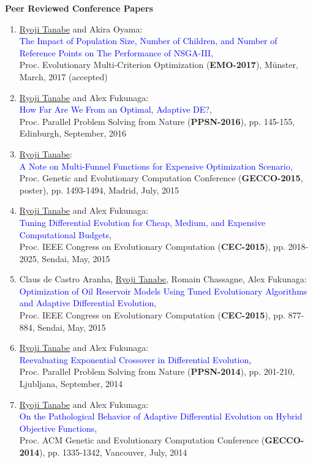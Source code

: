 \documentclass[letterpaper]{article}
\begin{document}
{\bf Peer Reviewed Conference Papers}
\begin{enumerate}
\small
\item \underline{Ryoji Tanabe} and Akira Oyama: \\\textcolor{blue}{The Impact of Population Size, Number of Children, and Number of Reference Points on The Performance of NSGA-III}, \\Proc. Evolutionary Multi-Criterion Optimization ({\bf EMO-2017}), M\"unster, March, 2017 (accepted)
\item \underline{Ryoji Tanabe} and Alex Fukunaga: \\\textcolor{blue}{How Far Are We From an Optimal, Adaptive DE?}, \\Proc. Parallel Problem Solving from Nature ({\bf PPSN-2016}), pp. 145-155, Edinburgh, September, 2016
\item \underline{Ryoji Tanabe}: \\\textcolor{blue}{A Note on Multi-Funnel Functions for Expensive Optimization Scenario}, \\Proc. Genetic and Evolutionary Computation Conference ({\bf GECCO-2015}, poster), pp. 1493-1494, Madrid, July, 2015
\item \underline{Ryoji Tanabe} and Alex Fukunaga: \\\textcolor{blue}{Tuning Differential Evolution for Cheap, Medium, and Expensive Computational Budgets},\\ Proc. IEEE Congress on Evolutionary Computation ({\bf CEC-2015}), pp. 2018-2025, Sendai, May, 2015
\item Claus de Castro Aranha, \underline{Ryoji Tanabe}, Romain Chassagne, Alex Fukunaga: \\\textcolor{blue}{Optimization of Oil Reservoir Models Using Tuned Evolutionary Algorithms and Adaptive Differential Evolution}, \\Proc. IEEE Congress on Evolutionary Computation ({\bf CEC-2015}), pp. 877-884, Sendai, May, 2015
%
\item \underline{Ryoji Tanabe} and Alex Fukunaga: \\\textcolor{blue}{Reevaluating Exponential Crossover in Differential Evolution}, \\Proc. Parallel Problem Solving from Nature ({\bf PPSN-2014}), pp. 201-210, Ljubljana, September, 2014
\item \underline{Ryoji Tanabe} and Alex Fukunaga:\\ \textcolor{blue}{On the Pathological Behavior of Adaptive Differential Evolution on Hybrid Objective Functions},\\ Proc. ACM Genetic and Evolutionary Computation Conference ({\bf GECCO-2014}), pp. 1335-1342, Vancouver, July, 2014

\end{enumerate}
\end{document}
